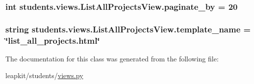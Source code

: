 \hypertarget{classstudents_1_1views_1_1_list_all_projects_view_a4b0bc6c6be4be3fd1bdaf6b886dffd61}{
\subsubsection[{paginate\-\_\-by}]{\setlength{\rightskip}{0pt plus 5cm}int students.\-views.\-List\-All\-Projects\-View.\-paginate\-\_\-by = 20\hspace{0.3cm}{\ttfamily [static]}}}\label{classstudents_1_1views_1_1_list_all_projects_view_a4b0bc6c6be4be3fd1bdaf6b886dffd61}
\hypertarget{classstudents_1_1views_1_1_list_all_projects_view_ab06ec282a4c4a4961f2bf7dc0fd60488}{
\subsubsection[{template\-\_\-name}]{\setlength{\rightskip}{0pt plus 5cm}string students.\-views.\-List\-All\-Projects\-View.\-template\-\_\-name = \char`\"{}list\-\_\-all\-\_\-projects.\-html\char`\"{}\hspace{0.3cm}{\ttfamily [static]}}}\label{classstudents_1_1views_1_1_list_all_projects_view_ab06ec282a4c4a4961f2bf7dc0fd60488}


The documentation for this class was generated from the following file\-:\begin{DoxyCompactItemize}
\item 
leapkit/students/\hyperlink{views_8py}{views.\-py}\end{DoxyCompactItemize}

